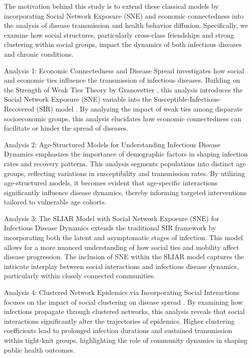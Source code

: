 \documentclass[9 pt]{article} %
\begin{document}
The motivation behind this study is to extend these classical models by incorporating Social Network Exposure (SNE) and economic connectedness into the analysis of disease transmission and health behavior diffusion. Specifically, we examine how social structures, particularly cross-class friendships and strong clustering within social groups, impact the dynamics of both infectious diseases and chronic conditions.

Analysis 1: Economic Connectedness and Disease Spread investigates how social and economic ties influence the transmission of infectious diseases. Building on the Strength of Weak Ties Theory by Granovetter \cite{granovetter1973strength}, this analysis introduces the Social Network Exposure (SNE) variable into the Susceptible-Infectious-Recovered (SIR) model \cite{kermack1927contribution}. By analyzing the impact of weak ties among disparate socioeconomic groups, this analysis elucidates how economic connectedness can facilitate or hinder the spread of diseases.

Analysis 2: Age-Structured Models for Understanding Infectious Disease Dynamics \cite{diekmann2013mathematical} emphasizes the importance of demographic factors in shaping infection rates and recovery patterns. This analysis segments populations into distinct age groups, reflecting variations in susceptibility and transmission rates. By utilizing age-structured models, it becomes evident that age-specific interactions significantly influence disease dynamics, thereby informing targeted interventions tailored to vulnerable age cohorts.

Analysis 3: The SLIAR Model \cite{ajelli2010sliar} with Social Network Exposure (SNE) for Infectious Disease Dynamics extends the traditional SIR framework by incorporating both the latent and asymptomatic stages of infection. This model allows for a more nuanced understanding of how social ties and mobility affect disease progression. The inclusion of SNE within the SLIAR model captures the intricate interplay between social interactions and infectious disease dynamics, particularly within closely connected communities.

Analysis 4: Clustered Network Epidemics via Incorporating Social Interactions focuses on the impact of social clustering on disease spread \cite{miller2009percolation}. By examining how infections propagate through clustered networks, this analysis reveals that social interactions significantly alter the trajectories of epidemics. Higher clustering coefficients lead to prolonged infection durations and sustained transmission within tight-knit groups, highlighting the role of community dynamics in shaping public health outcomes.
\end{document}
